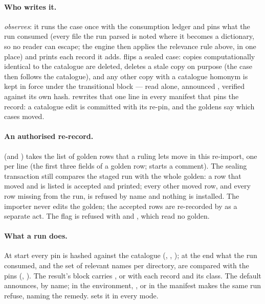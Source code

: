 \documentclass[11pt,a4paper]{article}
\begin{document}
\paragraph{Who writes it.}
 \emph{observes}: it runs the case once with
the consumption ledger and pins what the run consumed (every file the run parsed
is noted where it becomes a dictionary, so no reader can escape; the engine
then applies the relevance rule above, in one place) and prints each record it
adds.   flips a sealed
case: copies computationally identical to the catalogue are deleted,
 deletes a stale copy on purpose (the case then follows the
catalogue), and any other copy with a catalogue homonym is kept in force under
the transitional  block --- read alone,
announced \code{[held]}, verified against its own hash.
 rewrites that one line in every
manifest that pins the record: a catalogue edit is committed with its re-pin,
and the goldens say which cases moved.

\paragraph{An authorised re-record.}
 (and
) takes the list of golden
rows that a ruling lets move in this re-import, one  per line
(the first three fields of a golden row; \code{\#} starts a comment).  The
sealing transaction still compares the staged run with the whole golden: a row
that moved and is listed is accepted and printed; every other moved row, and
every row missing from the run, is refused by name and nothing is installed.
The importer never edits the golden; the accepted rows are re-recorded by
 as a separate act.  The flag is refused with
 and , which read no golden.

\paragraph{What a run does.}
At start every pin is hashed against the catalogue (,
, ); at the end what the run consumed, and the
set of relevant names per directory, are compared with the pins
(, ).  The result's  block carries
, or  with each record and its class.  The default
announces, by name;  in the environment,
, or  in the manifest makes the
same run refuse, naming the remedy.   sets it in every mode.
\end{document}
